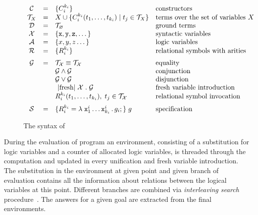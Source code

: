 \begin{figure}[t]
\centering
\[
\begin{array}{ccll}
  \mathcal{C} & = & \{C_i^{k_i}\} & \mbox{constructors} \\
  \mathcal{T}_X & = & X \cup \{C_i^{k_i} (t_1, \dots, t_{k_i}) \mid t_j\in\mathcal{T}_X\} & \mbox{terms over the set of variables $X$} \\
  \mathcal{D} & = & \mathcal{T}_\emptyset & \mbox{ground terms}\\
  \mathcal{X} & = & \{ \ttt{x}, \ttt{y}, \ttt{z}, \dots \} & \mbox{syntactic variables} \\
  \mathcal{A} & = & \{ x, y, z \dots \} & \mbox{logic variables} \\
  \mathcal{R} & = & \{ R_i^{k_i}\} &\mbox{relational symbols with arities} \\[2mm]
  \mathcal{G} & = & \mathcal{T_X}\equiv\mathcal{T_X}   &  \mbox{equality} \\
              &   & \mathcal{G}\wedge\mathcal{G}     & \mbox{conjunction} \\
              &   & \mathcal{G}\vee\mathcal{G}       &\mbox{disjunction} \\
              &   & \mbox{\lstinline|fresh|}\;\mathcal{X}\;.\;\mathcal{G} & \mbox{fresh variable introduction} \\
              &   & R_i^{k_i} (t_1,\dots,t_{k_i}),\;t_j\in\mathcal{T_X} & \mbox{relational symbol invocation} \\[2mm]
  \mathcal{S} & = & \{R_i^{k_i} = \lambda\;\ttt{x}_1^i\dots \ttt{x}_{k_i}^i\,.\, g_i;\}\; g & \mbox{specification}
\end{array}
\]
\caption{The syntax of \mK}
\label{fig:syntax}
\end{figure}

During the evaluation of \mK program an environment, consisting of a substitution for logic variables and a counter of allocated logic
variables, is threaded through the computation and updated in every unification and fresh variable introduction.
The substitution in the environment at given point and given branch of evaluation contains all the information about relations between
the logical variables at this point.
Different branches are combined via \emph{interleaving search} procedure~\cite{InterleavingSearch}.
The answers for a given goal are extracted from the final environments.

